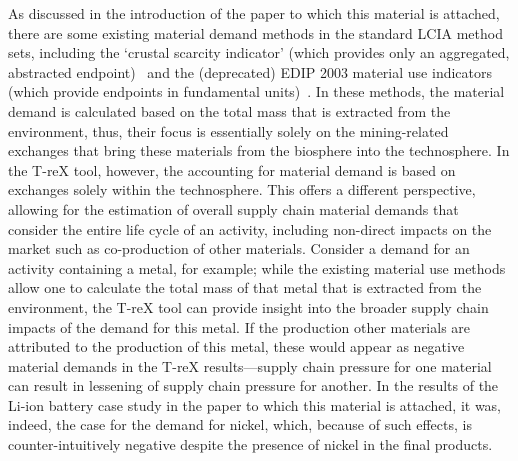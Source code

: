 \documentclass{article}
\begin{document}
As discussed in the introduction of the paper to which this material is attached, there are some existing material demand methods in the standard LCIA method sets, including the `crustal scarcity indicator' (which provides only an aggregated, abstracted endpoint)~\citep{arvidsson2020csi} and the (deprecated) EDIP 2003 material use indicators (which provide endpoints in fundamental units)~\citep{hauschild2003edip}. In these methods, the material demand is calculated based on the total mass that is extracted from the environment, thus, their focus is essentially solely on the mining-related exchanges that bring these materials from the biosphere into the technosphere. In the T-reX tool, however, the accounting for material demand is based on exchanges solely within the technosphere. This offers a different perspective, allowing for the estimation of overall supply chain material demands that consider the entire life cycle of an activity, including non-direct impacts on the market such as co-production of other materials. Consider a demand for an activity containing a metal, for example; while the existing material use methods allow one to calculate the total mass of that metal that is extracted from the environment, the T-reX tool can provide insight into the broader supply chain impacts of the demand for this metal. If the production other materials are attributed to the production of this metal, these would appear as negative material demands in the T-reX results---supply chain pressure for one material can result in lessening of supply chain pressure for another. In the results of the Li-ion battery case study in the paper to which this material is attached, it was, indeed, the case for the demand for nickel, which, because of such effects, is counter-intuitively negative despite the presence of nickel in the final products.
\end{document}
